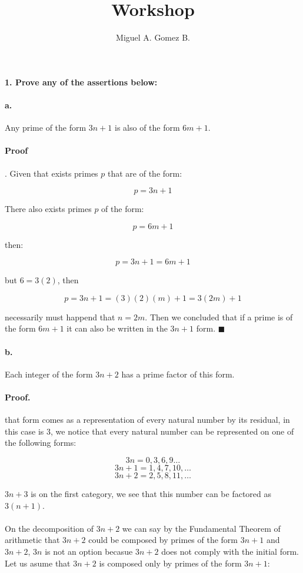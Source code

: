 \documentclass{article}
\title{Workshop}
\author{Miguel A. Gomez B.}
\begin{document}
	\maketitle
\paragraph{1. Prove any of the assertions below:}
\paragraph{a.} Any prime of the form $3n+1$ is also of the form $6m + 1$.

\paragraph{Proof}. Given that exists primes $p$ that are of the form:

$$p = 3n + 1$$

There also exists primes $p$ of the form:

$$p = 6m + 1$$

then:

$$p = 3n + 1 = 6m + 1$$

but $6 = 3(2)$, then

$$p = 3n + 1 = (3)(2)(m) + 1 = 3(2m) + 1$$

necessarily must happend that $n = 2m$. Then we concluded that if a prime is of the form $6m + 1$ it can also be written in the $3n+1$ form. $\blacksquare$

\paragraph{b.} Each integer of the form $3n + 2$ has a prime factor of this form.

\paragraph{Proof.} that form comes as a representation of every natural number by its residual, in this case is $3$, we notice that every natural number can be represented on one of the following forms:

$$3n = 0, 3, 6 ,9 \dots$$
$$3n + 1 = 1, 4, 7, 10, \dots$$
$$3n + 2 = 2, 5 , 8, 11, \dots$$

$3n + 3$ is on the first category, we see that this number can be factored as $3(n+1)$.

\paragraph{} On the decomposition of $3n +2$ we can say by the Fundamental Theorem of arithmetic that $3n + 2$ could be composed by primes of the form $3n + 1$ and $3n + 2$, $3n$ is not an option becasue $3n + 2$ does not comply with the initial form. Let us asume that $3n + 2$ is composed only by primes of the form $3n +1$:
\end{document}
